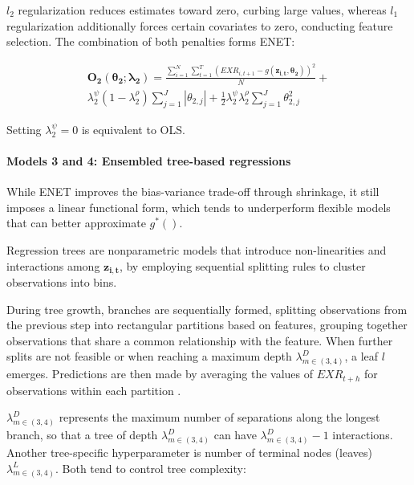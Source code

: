 \documentclass[preprint,12pt,authoryear]{elsarticle}
\begin{document}
$l_{2}$ regularization reduces estimates toward zero, curbing large values, whereas $l_{1}$ regularization additionally forces certain covariates to zero, conducting feature selection. The combination of both penalties forms ENET:

\begin{multline}
\label{elasticeq}
\mathbf{O_{2}}(\mathbf{\theta_{2}}; \mathbf{\lambda_{2}}) = \frac{\sum_{i=1}^{N}\sum_{t=1}^{T}(EXR_{i,t+1} - g(\mathbf{z_{i,t}},\mathbf{\theta_{2}}))^2}{N} + \\ \lambda^{\psi}_{2}(1-\lambda^{\rho}_{2})\sum_{j=1}^{J}|\theta_{2,j}| + \frac{1}{2}\lambda^{\psi}_{2}\lambda^{\rho}_{2}\sum_{j=1}^{J}\theta_{2,j}^{2}
\end{multline}

Setting $\lambda^{\psi}_{2} = 0$ is equivalent to OLS.


\paragraph{Models 3 and 4: Ensembled tree-based regressions}

While ENET improves the bias-variance trade-off through shrinkage, it still imposes a linear functional form, which tends to underperform flexible models that can better approximate $g^{*}()$.  

Regression trees are nonparametric models that introduce non-linearities and interactions among $\mathbf{z_{i,t}}$, by employing sequential splitting rules to cluster observations into bins. 

During tree growth, branches are sequentially formed, splitting observations from the previous step into rectangular partitions based on features, grouping together observations that share a common relationship with the feature. When further splits are not feasible or when reaching a maximum depth $\lambda^{D}_{m \in (3,4)}$, a leaf $l$ emerges. Predictions are then made by averaging the values of ${EXR}_{t+h}$ for observations within each partition \citep{kellyxiu2023}.

$\lambda^{D}_{m \in (3,4)}$ represents the maximum number of separations along the longest branch, so that a tree of depth $\lambda^{D}_{m \in (3,4)}$ can have $\lambda^{D}_{m \in (3,4)} - 1$ interactions. Another tree-specific hyperparameter is number of terminal nodes (leaves) $\lambda^{L}_{m \in (3,4)}$. Both tend to control tree complexity:
\end{document}
